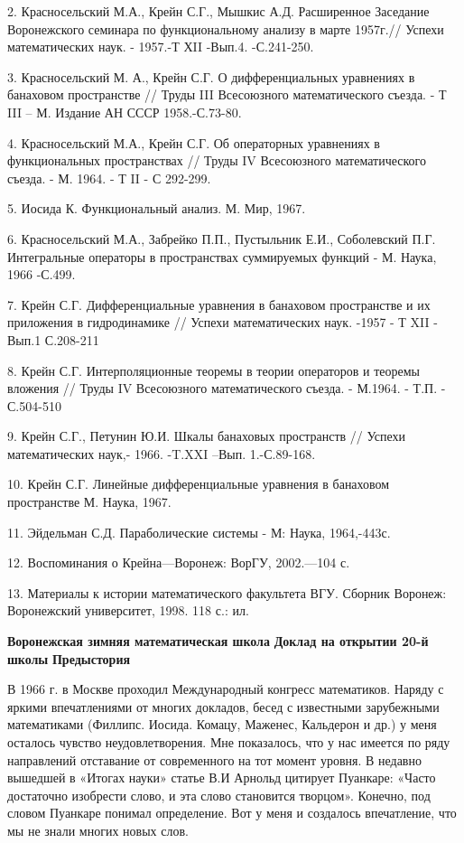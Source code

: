 2.	Красносельский М.А., Крейн С.Г., Мышкис А.Д. Расширенное Заседание Воронежского семинара по функциональному анализу в марте 1957г.// Успехи математических наук. - 1957.-Т ХII -Вып.4. -С.241-250.

3. Красносельский М. А., Крейн С.Г. О дифференциальных уравнениях в банаховом пространстве // Труды III Всесоюзного математического съезда. - Т III – М.  Издание АН СССР 1958.-С.73-80.

4. Красносельский М.А., Крейн С.Г. Об операторных уравнениях в функциональных пространствах // Труды IV Всесоюзного математического съезда. - М. 1964. - Т II - С 292-299.

5.	Иосида К. Функциональный анализ. М. Мир, 1967.

6.	Красносельский М.А., Забрейко П.П., Пустыльник Е.И., Соболевский П.Г. Интегральные операторы в пространствах суммируемых функций - М. Наука, 1966 -С.499.

7. Крейн С.Г. Дифференциальные уравнения в банаховом пространстве и их приложения в гидродинамике // Успехи математических наук. -1957 - Т XII - Вып.1 С.208-211

8.	Крейн С.Г. Интерполяционные теоремы в теории операторов и теоремы вложения // Труды IV Всесоюзного математического съезда. - М.1964. - Т.П. - С.504-510

9.	Крейн С.Г., Петунин Ю.И. Шкалы банаховых пространств // Успехи математических наук,- 1966. -T.XXI –Вып. 1.-С.89-168.

10.	Крейн С.Г. Линейные дифференциальные уравнения в банаховом пространстве М. Наука, 1967.

11.	Эйдельман С.Д. Параболические системы - М: Наука, 1964,-443с.

12.	 Воспоминания о Крейна—Воронеж: ВорГУ, 2002.—104 с.

13.	 Материалы к истории математического факультета ВГУ. Сборник  Воронеж:
Воронежский университет, 1998. 118 с.: ил.

{\bf Воронежская зимняя математическая школа}
{\bf Доклад на открытии 20-й школы}
{\bf Предыстория}

В 1966 г. в Москве проходил Международный конгресс математиков. Наряду с яркими впечатлениями от многих докладов, бесед с известными зарубежными математиками (Филлипс. Иосида. Комацу, Маженес, Кальдерон и др.) у меня осталось чувство неудовлетворения. Мне показалось, что у нас имеется по ряду направлений отставание от современного на тот момент уровня. В недавно вышедшей в «Итогах науки» статье В.И Арнольд цитирует Пуанкаре: «Часто достаточно изобрести слово, и эта слово становится творцом». Конечно, под словом Пуанкаре понимал определение. Вот у меня и создалось впечатление, что мы не знали многих новых слов.

